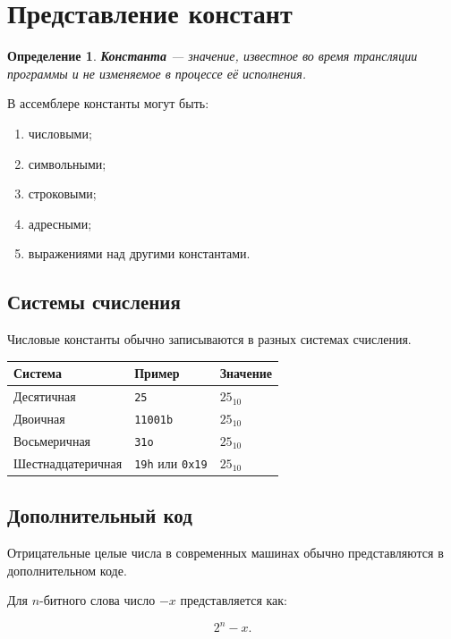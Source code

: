 \documentclass[12pt,a4paper]{article}
\newtheorem{definition}{Определение}
\begin{document}
\section{Представление констант}

\begin{definition}
\textbf{Константа} --- значение, известное во время трансляции программы и не изменяемое в процессе её исполнения.
\end{definition}

В ассемблере константы могут быть:

\begin{enumerate}
    \item числовыми;
    \item символьными;
    \item строковыми;
    \item адресными;
    \item выражениями над другими константами.
\end{enumerate}

\subsection{Системы счисления}

Числовые константы обычно записываются в разных системах счисления.

\begin{center}
\begin{tabular}{lll}
\toprule
Система & Пример & Значение \\
\midrule
Десятичная & \texttt{25} & $25_{10}$ \\
Двоичная & \texttt{11001b} & $25_{10}$ \\
Восьмеричная & \texttt{31o} & $25_{10}$ \\
Шестнадцатеричная & \texttt{19h} или \texttt{0x19} & $25_{10}$ \\
\bottomrule
\end{tabular}
\end{center}

\subsection{Дополнительный код}

Отрицательные целые числа в современных машинах обычно представляются в дополнительном коде.

Для $n$-битного слова число $-x$ представляется как:

\[
2^n - x.
\]
\end{document}
